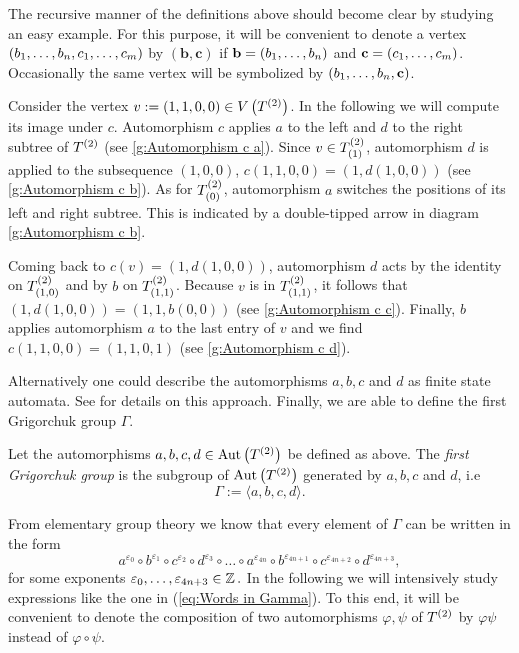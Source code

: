 The recursive manner of the definitions above should become clear by studying an easy example. For this purpose, it will be convenient to denote a vertex $(\seq{b},\seq[m]{c})$ by $(\mathbf{b},\mathbf{c})$ if $\mathbf{b}=(\seq{b})$ and $\mathbf{c}=(\seq[m]{c})$. Occasionally the same vertex will be symbolized by $(\seq{b},\mathbf{c})$.
\begin{exam}
Consider the vertex $v:=(1,1,0,0)\in\VT$. In the following we will compute its image under $c$. Automorphism $c$ applies $a$ to the left and $d$ to the right subtree of $\T$ (see \cref{g:Automorphism c a}). Since $v\in\ST{(1)}$, automorphism $d$ is applied to the subsequence $(1,0,0)$, \ie{} $c(1,1,0,0)=(1,d(1,0,0))$ (see \cref{g:Automorphism c b}). As for $\ST{(0)}$, automorphism $a$ switches the positions of its left and right subtree. This is indicated by a double-tipped arrow in diagram \ref{g:Automorphism c b}.

Coming back to $c(v)=(1,d(1,0,0))$, automorphism $d$ acts by the identity on $\ST{(1,0)}$ and by $b$ on $\ST{(1,1)}$. Because $v$ is in $\ST{(1,1)}$, it follows that $(1,d(1,0,0))=(1,1,b(0,0))$ (see \cref{g:Automorphism c c}). Finally, $b$ applies automorphism $a$ to the last entry of $v$ and we find $c(1,1,0,0)=(1,1,0,1)$ (see \cref{g:Automorphism c d}).
\end{exam}

Alternatively one could describe the automorphisms $a,b,c$ and $d$ as finite state automata. See \cite{de2000topics} for details on this approach. Finally, we are able to define the first Grigorchuk group $\Gamma$.
\begin{defin}
Let the automorphisms $a,b,c,d\in\AutT$ be defined as above. The \emph{first Grigorchuk group} is the subgroup of $\AutT$ generated by $a,b,c$ and $d$, i.e
\begin{equation*}
\Gamma:=\langle a,b,c,d\rangle.
\end{equation*}
\end{defin}

From elementary group theory we know that every element of $\Gamma$ can be written in the form
\begin{equation}\label{eq:Words in Gamma}
a^{\varepsilon_0}\circ b^{\varepsilon_1}\circ c^{\varepsilon_2}\circ d^{\varepsilon_3}\circ\ldots\circ a^{\varepsilon_{4n}}\circ b^{\varepsilon_{4n+1}}\circ c^{\varepsilon_{4n+2}}\circ d^{\varepsilon_{4n+3}},
\end{equation}
for some exponents $\varepsilon_0,\ldots,\varepsilon_{4n+3}\in\Z.$ In the following we will intensively study expressions like the one in (\ref{eq:Words in Gamma}). To this end, it will be convenient to denote the composition of two automorphisms $\varphi,\psi$ of $\T$ by $\varphi\psi$ instead of $\varphi\circ\psi.$


